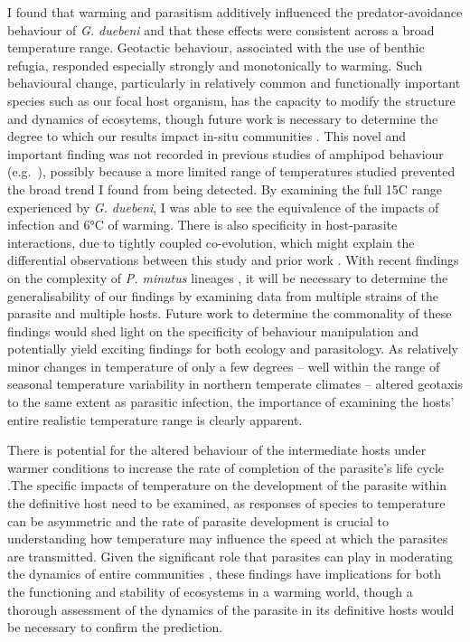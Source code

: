I found that warming and parasitism additively influenced the predator-avoidance behaviour of \emph{G. duebeni} and that these effects were consistent across a broad temperature range. Geotactic behaviour, associated with the use of benthic refugia, responded especially strongly and monotonically to warming. Such behavioural change, particularly in relatively common and functionally important species such as our focal host organism, has the capacity to modify the structure and dynamics of ecosytems, though future work is necessary to determine the degree to which our results impact in-situ communities \citep{kefi2015, kefi2016, suraci2016, donohue2017}. This novel and important finding was not recorded in previous studies of amphipod behaviour (e.g.\ \citet{labaude2017}), possibly because a more limited range of temperatures studied prevented the broad trend I found from being detected. By examining the full 15\degree C range experienced by \emph{G. duebeni}, I was able to see the equivalence of the impacts of infection and 6°C of warming. There is also specificity in host-parasite interactions, due to tightly coupled co-evolution, which might explain the differential observations between this study and prior work \citep{omahony2004, westram2011}. With recent findings on the complexity of \emph{P. minutus} lineages \citep{zittel2018}, it will be necessary to determine the generalisability of our findings by examining data from multiple strains of the parasite and multiple hosts. Future work to determine the commonality of these findings would shed light on the specificity of behaviour manipulation and potentially yield exciting findings for both ecology and parasitology. As relatively minor changes in temperature of only a few degrees – well within the range of seasonal temperature variability in northern temperate climates – altered geotaxis to the same extent as parasitic infection, the importance of examining the hosts’ entire realistic temperature range is clearly apparent. 

There is potential for the altered behaviour of the intermediate hosts under warmer conditions to increase the rate of completion of the parasite’s life cycle \citep{tierney1993, strepparava2017}.The specific impacts of temperature on the development of the parasite within the definitive host need to be examined, as responses of species to temperature can be asymmetric \citep{dell2014, goedknegt2015} and the rate of parasite development is crucial to understanding how temperature may influence the speed at which the parasites are transmitted. Given the significant role that parasites can play in moderating the dynamics of entire communities \citep{dunne2013}, these findings have implications for both the functioning and stability of ecosystems in a warming world, though a thorough assessment of the dynamics of the parasite in its definitive hosts would be necessary to confirm the prediction.

